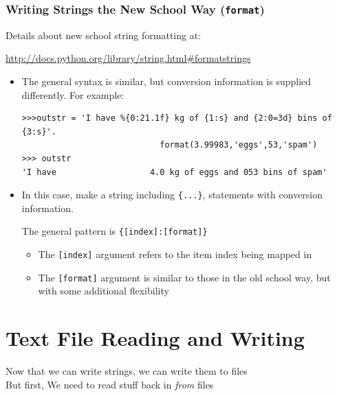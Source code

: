 \documentclass{beamer}
\newcommand\Fontvi{\fontsize{8.5}{7.2}\selectfont}
\begin{document}
\begin{frame}[fragile]
\frametitle{Writing Strings the New School Way (\texttt{format})}
Details about new school string formatting at:\newline{}
\begin{small}
\Fontvi
\url{http://docs.python.org/library/string.html#formatstrings}
\end{small}
\begin{itemize}
\item The general syntax is similar, but conversion information is supplied differently. For example:
\begin{lstlisting}
>>>outstr = 'I have %{0:21.1f} kg of {1:s} and {2:0=3d} bins of {3:s}'.
							format(3.99983,'eggs',53,'spam')
>>> outstr
'I have                   4.0 kg of eggs and 053 bins of spam'
\end{lstlisting}
\item In this case, make a string including \texttt{\{...\}}, statements with conversion information.

The general pattern is \texttt{\{[index]:[format]\}}\newline{}
\begin{itemize}
\item The \texttt{[index]} argument refers to the item index being mapped in\newline{}
\item The \texttt{[format]} argument is similar to those in the old school way, but with some additional flexibility
\end{itemize}

\end{itemize}
\end{frame}
\section{Text File Reading and Writing}
\begin{frame}[fragile]
Now that we can write strings, we can write them to files \newline{} \\
But first, We need to read stuff back in \emph{from} files
\end{frame}
\end{document}
